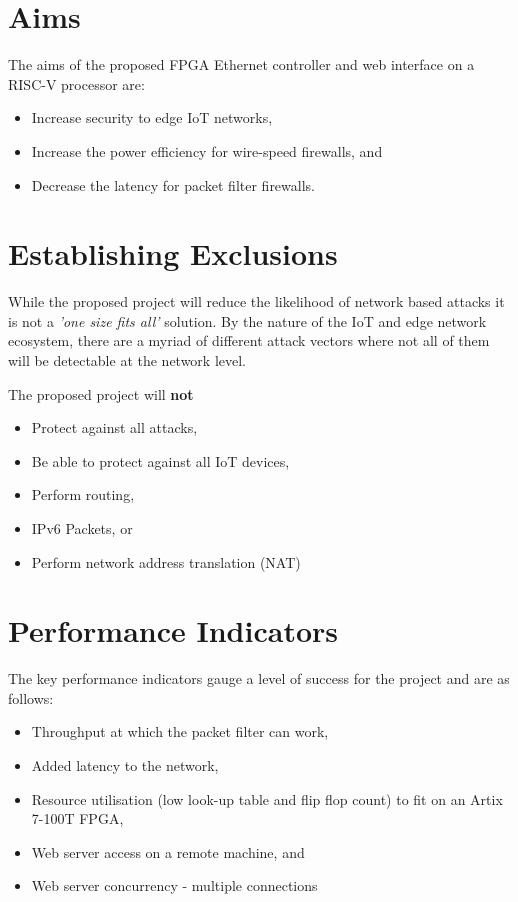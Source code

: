 \section{Aims}

The aims of the proposed FPGA Ethernet controller and web interface on a RISC-V processor are:

\begin{itemize}
    \item Increase security to edge IoT networks,
    \item Increase the power efficiency for wire-speed firewalls, and
    \item Decrease the latency for packet filter firewalls.
\end{itemize}



\section{Establishing Exclusions}

While the proposed project will reduce the likelihood of network based attacks it is not a \textit{'one size fits all'} solution. 
By the nature of the IoT and edge network ecosystem, there are a myriad of different attack vectors where not all of them will be detectable at the
network level.

The proposed project will \textbf{not}
\begin{itemize}
    \item Protect against all attacks,
    \item Be able to protect against all IoT devices,
    \item Perform routing,
    \item IPv6 Packets, or
    \item Perform network address translation (NAT)
\end{itemize}



\section{Performance Indicators}
The key performance indicators gauge a level of success for the project and are as follows: 

\begin{itemize}
    \item Throughput at which the packet filter can work,
    \item Added latency to the network,
    \item Resource utilisation (low look-up table and flip flop count) to fit on an Artix 7-100T FPGA,
    \item Web server access on a remote machine, and
    \item Web server concurrency - multiple connections
\end{itemize}



